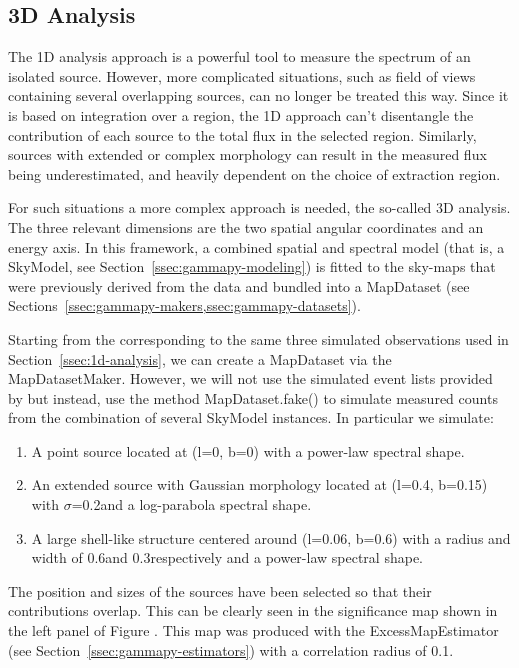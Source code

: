 \subsection{3D Analysis}
\label{ssec:3d-analysis}
The 1D analysis approach is a powerful tool to measure the spectrum of an isolated source. However, more complicated situations, such as field of views containing several overlapping sources, can no longer be treated this way. Since it is based on integration over a region, the 1D approach can't disentangle the contribution of each source to the total flux in the selected region. Similarly, sources with extended or complex morphology can result in the measured flux being underestimated, and heavily dependent on the choice of extraction region.

For such situations a more complex approach is needed, the so-called 3D analysis. The three relevant dimensions are the two spatial angular coordinates and an energy axis. In this framework, a combined spatial and spectral model (that is, a SkyModel, see Section~\ref{ssec:gammapy-modeling}) is fitted to the sky-maps that were previously derived from the data and bundled into a MapDataset (see Sections~\ref{ssec:gammapy-makers,ssec:gammapy-datasets}).

Starting from the \irfs corresponding to the same three simulated \cta observations used in Section~\ref{ssec:1d-analysis}, we can create a MapDataset via the MapDatasetMaker. However, we will not use the simulated event lists provided by \cta but instead, use the method MapDataset.fake() to simulate measured counts from the combination of several SkyModel instances. In particular we simulate:
\begin{enumerate}
	\item A point source located at (l=0\textdegree, b=0\textdegree) with a power-law spectral shape.
	\item An extended source with Gaussian morphology located at (l=0.4\textdegree, b=0.15\textdegree) with $\sigma$=0.2\textdegree and a log-parabola spectral shape.
	\item A large shell-like structure centered around (l=0.06\textdegree, b=0.6\textdegree) with a radius and width of 0.6\textdegree and 0.3\textdegree respectively and a power-law spectral shape.
\end{enumerate}
The position and sizes of the sources have been selected so that their contributions overlap. This can be clearly seen in the significance map shown in the left panel of Figure . This map was produced with the ExcessMapEstimator (see Section~\ref{ssec:gammapy-estimators}) with a correlation radius of 0.1\textdegree.

